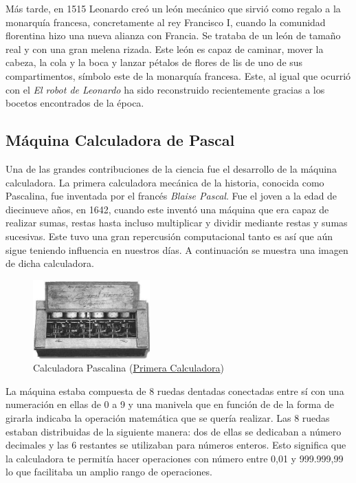 Más tarde, en 1515 Leonardo creó un león mecánico que sirvió como regalo a la monarquía francesa, concretamente al rey Francisco I, cuando la comunidad florentina hizo una nueva alianza con Francia. Se trataba de un león de tamaño real y con una gran melena rizada. Este león es capaz de caminar, mover la cabeza, la cola y la boca y lanzar pétalos de flores de lis de uno de sus compartimentos, símbolo este de la monarquía francesa. Este, al igual que ocurrió con el \textit{El robot de Leonardo} ha sido reconstruido recientemente gracias a los bocetos encontrados de la época.


\subsection{Máquina Calculadora de Pascal}

Una de las grandes contribuciones de la ciencia fue el desarrollo de la máquina calculadora. La primera calculadora mecánica de la historia, conocida como Pascalina, fue inventada por el francés \textit{Blaise Pascal}. Fue el joven a la edad de diecinueve años, en 1642, cuando este inventó una máquina que era capaz de realizar sumas, restas hasta incluso multiplicar y dividir mediante restas y sumas sucesivas. Este tuvo una gran repercusión computacional tanto es así que aún sigue teniendo influencia en nuestros días. A continuación se muestra una imagen de dicha calculadora.

\begin{figure}[H]
\begin{center}
  \includegraphics[width=0.4\textwidth]{./EtapaPrimeriza/imagenes/cp.jpg}
  \caption{Calculadora Pascalina (\href{https://www.tispain.com/2014/11/la-pascalina-la-primera-calculadora.html} {Primera Calculadora})}
  \label{cp}
\end{center}
\end{figure}

La máquina estaba compuesta de 8 ruedas dentadas conectadas entre sí con una numeración en ellas de 0 a 9 y una manivela que en función de de la forma de girarla indicaba la operación matemática que se quería realizar. Las 8 ruedas estaban distribuidas de la siguiente manera: dos de ellas se dedicaban a número decimales y las 6 restantes se utilizaban para números enteros. Esto significa que la calculadora te permitía hacer operaciones con número entre 0,01 y 999.999,99 lo que facilitaba un amplio rango de operaciones.\\


